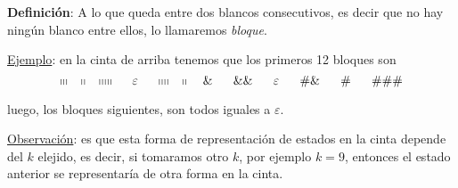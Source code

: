 \begin{frame}
	\textbf{Definición}: A lo que queda entre dos blancos consecutivos, es decir que no hay ningún blanco entre ellos, lo
	llamaremos \textit{bloque}.

	\vspace{3mm}
	\PN \underline{Ejemplo}: en la cinta de arriba tenemos que los primeros 12 bloques son
	\begin{equation*}
		\shortmid \shortmid \shortmid \ \ \ \shortmid \shortmid \ \ \ \shortmid \shortmid \shortmid \shortmid \shortmid \ \
		\ \ \varepsilon \ \ \ \ \shortmid \shortmid \shortmid \shortmid \ \ \ \shortmid \shortmid \ \ \ \& \ \ \ \ \ \&\& \
		\ \ \ \ \varepsilon \ \ \ \ \ \#\& \ \ \ \ \ \# \ \ \ \ \ \#\#\#
	\end{equation*}

	\PN luego, los bloques siguientes, son todos iguales a $\varepsilon$.

	\vspace{3mm}
	\PN \underline{Observación}: es que esta forma de representación de estados en la cinta depende del $k$ elejido, es
	decir, si tomaramos otro $k$, por ejemplo $k=9$, entonces el estado anterior se representaría de otra forma en la
	cinta.
\end{frame}
